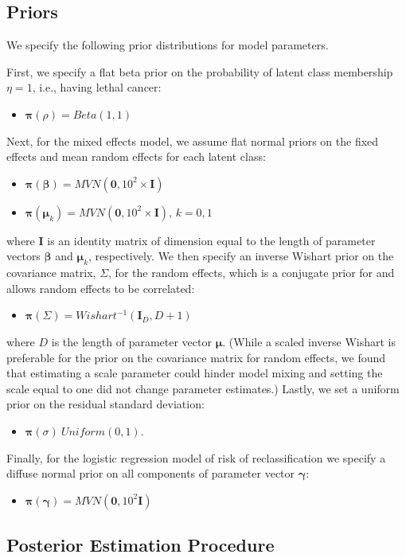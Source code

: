 \documentclass[12pt, letterpaper]{article}
\newcommand{\bmbeta}{\boldsymbol{\beta}}
\newcommand{\bmpi}{\boldsymbol{\pi}}
\newcommand{\bmmu}{\boldsymbol{\mu}}
\newcommand{\bmgamma}{\boldsymbol{\gamma}}
\newcommand{\bmI}{\mathbf{I}}
\newcommand{\bi}{\begin{itemize}}
\newcommand{\ei}{\end{itemize}}
\begin{document}
\subsection{Priors}
We specify the following prior distributions for model parameters. %

First, we specify a flat beta prior on the probability of latent class membership $\eta=1$, i.e., having lethal cancer: 
\bi
\item $\bmpi(\rho) = Beta (1,1)$
\ei

Next, for the mixed effects model, we assume flat normal priors on the fixed effects and mean random effects for each latent class:
\bi
\item $\bmpi(\bmbeta) = MVN(\mathbf{0},10^2\times\bmI)$
\item $\bmpi(\bmmu_k) = MVN(\mathbf{0},10^2\times\bmI),\, k=0,1$
\ei
where $\bmI$ is an identity matrix of dimension equal to the length of parameter vectors $\bmbeta$ and $\bmmu_k$, respectively. We then specify an inverse Wishart prior on the covariance matrix, $\Sigma$, for the random effects, which is a conjugate prior for and allows random effects to be correlated:
\bi
\item $\bmpi(\Sigma) = Wishart^{-1}(\bmI_D,D+1)$
\ei
where $D$ is the length of parameter vector $\bmmu$. (While a scaled inverse Wishart is preferable for the prior on the covariance matrix for random effects, we found that estimating a scale parameter could hinder model mixing and setting the scale equal to one did not change parameter estimates.) Lastly, we set a uniform prior on the residual standard deviation:
\bi
\item $\bmpi(\sigma) ~ Uniform(0,1)$.
\ei

Finally, for the logistic regression model of risk of reclassification we specify a diffuse normal prior on all components of parameter vector $\bmgamma$:
\bi
\item $\bmpi(\bmgamma) = MVN(\mathbf{0}, 10^2\bmI)$ 
\ei


\subsection{Posterior Estimation Procedure}
\end{document}
